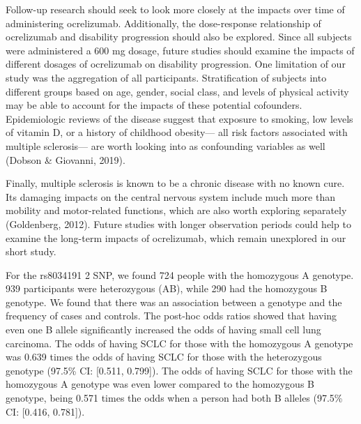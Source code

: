 \documentclass{article}
\begin{document}
	Follow-up research should seek to look more closely at the impacts over time of administering ocrelizumab. Additionally, the dose-response relationship of ocrelizumab and disability progression should also be explored. Since all subjects were administered a 600 mg dosage, future studies should examine the impacts of different dosages of ocrelizumab on disability progression. One limitation of our study was the aggregation of all participants. Stratification of subjects into different groups based on age, gender, social class, and levels of physical activity may be able to account for the impacts of these potential cofounders. Epidemiologic reviews of the disease suggest that exposure to smoking, low levels of vitamin D, or a history of childhood obesity— all risk factors associated with multiple sclerosis— are worth looking into as confounding variables as well (Dobson \& Giovanni, 2019).

	Finally, multiple sclerosis is known to be a chronic disease with no known cure. Its damaging impacts on the central nervous system include much more than mobility and motor-related functions, which are also worth exploring separately (Goldenberg, 2012). Future studies with longer observation periods could help to examine the long-term impacts of ocrelizumab, which remain unexplored in our short study.

	For the rs8034191 2 SNP, we found 724 people with the homozygous A genotype. 939 participants were heterozygous (AB), while 290 had the homozygous B genotype. We found that there was an association between a genotype and the frequency of cases and controls. The post-hoc odds ratios showed that having even one B allele significantly increased the odds of having small cell lung carcinoma. The odds of having SCLC for those with the homozygous A genotype was 0.639 times the odds of having SCLC for those with the heterozygous genotype (97.5\% CI: [0.511, 0.799]). The odds of having SCLC for those with the homozygous A genotype was even lower compared to the homozygous B genotype, being 0.571 times the odds when a person had both B alleles (97.5\% CI: [0.416, 0.781]).


	\newpage
\end{document}
